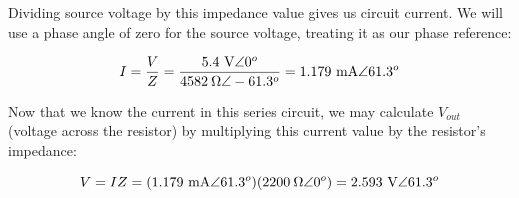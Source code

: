Dividing source voltage by this impedance value gives us circuit current.  We will use a phase angle of zero for the source voltage, treating it as our phase reference:

$$I = {V \over Z} = {5.4 \hbox{ V} \angle 0^o \over 4582 \> \Omega \angle -61.3^o} = 1.179 \hbox{ mA} \angle 61.3^o$$

Now that we know the current in this series circuit, we may calculate $V_{out}$ (voltage across the resistor) by multiplying this current value by the resistor's impedance:

$$V = IZ = (1.179 \hbox{ mA} \angle 61.3^o)(2200 \> \Omega \angle 0^o) = 2.593 \hbox{ V} \angle 61.3^o$$




